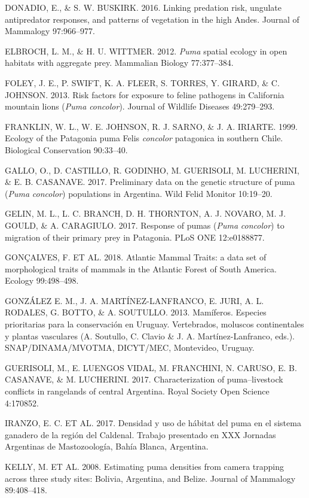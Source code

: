 \documentclass[
  x11names]{article}
\begin{document}
DONADIO, E., \& S. W. BUSKIRK. 2016. Linking predation risk, ungulate
antipredator responses, and patterns of vegetation in the high Andes.
Journal of Mammalogy 97:966--977.

ELBROCH, L. M., \& H. U. WITTMER. 2012. \textit{Puma} spatial ecology in
open habitats with aggregate prey. Mammalian Biology 77:377--384.

FOLEY, J. E., P. SWIFT, K. A. FLEER, S. TORRES, Y. GIRARD, \& C.
JOHNSON. 2013. Risk factors for exposure to feline pathogens in
California mountain lions (\textit{Puma} \textit{concolor}). Journal of
Wildlife Diseases 49:279--293.

FRANKLIN, W. L., W. E. JOHNSON, R. J. SARNO, \& J. A. IRIARTE. 1999.
Ecology of the Patagonia puma Felis \textit{concolor} patagonica in
southern Chile. Biological Conservation 90:33--40.

GALLO, O., D. CASTILLO, R. GODINHO, M. GUERISOLI, M. LUCHERINI, \& E. B.
CASANAVE. 2017. Preliminary data on the genetic structure of puma
(\textit{Puma} \textit{concolor}) populations in Argentina. Wild Felid
Monitor 10:19--20.

GELIN, M. L., L. C. BRANCH, D. H. THORNTON, A. J. NOVARO, M. J. GOULD,
\& A. CARAGIULO. 2017. Response of pumas (\textit{Puma}
\textit{concolor}) to migration of their primary prey in Patagonia. PLoS
ONE 12:e0188877.

GONÇALVES, F. ET AL. 2018. Atlantic Mammal Traits: a data set of
morphological traits of mammals in the Atlantic Forest of South America.
Ecology 99:498--498.

GONZÁLEZ E. M., J. A. MARTÍNEZ-LANFRANCO, E. JURI, A. L. RODALES, G.
BOTTO, \& A. SOUTULLO. 2013. Mamíferos. Especies prioritarias para la
conservación en Uruguay. Vertebrados, moluscos continentales y plantas
vasculares (A. Soutullo, C. Clavio \& J. A. Martínez-Lanfranco, eds.).
SNAP/DINAMA/MVOTMA, DICYT/MEC, Montevideo, Uruguay.

GUERISOLI, M., E. LUENGOS VIDAL, M. FRANCHINI, N. CARUSO, E. B.
CASANAVE, \& M. LUCHERINI. 2017. Characterization of puma--livestock
conflicts in rangelands of central Argentina. Royal Society Open Science
4:170852.

IRANZO, E. C. ET AL. 2017. Densidad y uso de hábitat del puma en el
sistema ganadero de la región del Caldenal. Trabajo presentado en XXX
Jornadas Argentinas de Mastozoología, Bahía Blanca, Argentina.

KELLY, M. ET AL. 2008. Estimating puma densities from camera trapping
across three study sites: Bolivia, Argentina, and Belize. Journal of
Mammalogy 89:408--418.
\end{document}
